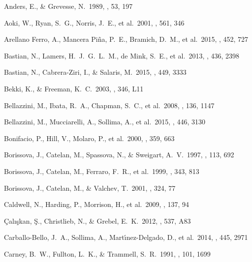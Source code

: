 \documentclass[12pt,preprint]{emulateapj}
\begin{document}
\begin{thebibliography}{}

 Anders, E., \& Grevesse, N.\ 1989, \gca, 53, 197

 Aoki, W., Ryan, S.~G., Norris, J.~E., et al.\ 2001, \apj, 561, 346

 Arellano Ferro, A., Mancera Pi{\~n}a, P.~E., Bramich, D.~M., et al.\ 2015, \mnras, 452, 727

 Bastian, N., Lamers, H.~J.~G.~L.~M., de Mink, S.~E., et al.\ 2013, \mnras, 436, 2398

 Bastian, N., Cabrera-Ziri, I., \& Salaris, M.\ 2015, \mnras, 449, 3333

 Bekki, K., \& Freeman, K.~C.\ 2003, \mnras, 346, L11

 Bellazzini, M., Ibata, R.~A., Chapman, S.~C., et al.\ 2008, \aj, 136, 1147

 Bellazzini, M., Mucciarelli, A., Sollima, A., et al.\ 2015, \mnras, 446, 3130

 Bonifacio, P., Hill, V., Molaro, P., et al.\ 2000, \aap, 359, 663

 Borissova, J., Catelan, M., Spassova, N., \& Sweigart, A.~V.\ 1997, \aj, 113, 692

 Borissova, J., Catelan, M., Ferraro, F.~R., et al.\ 1999, \aap, 343, 813

 Borissova, J., Catelan, M., \& Valchev, T.\ 2001, \mnras, 324, 77

 Caldwell, N., Harding, P., Morrison, H., et al.\ 2009, \aj, 137, 94

 {\c C}al{\i}{\c s}kan, {\c S}., Christlieb, N., \& Grebel, E.~K.\ 2012, \aap, 537, A83

 Carballo-Bello, J.~A., Sollima, A., Mart{\'{\i}}nez-Delgado, D., et al.\ 2014, \mnras, 445, 2971

 Carney, B.~W., Fullton, L.~K., \& Trammell, S.~R.\ 1991, \aj, 101, 1699


\end{thebibliography}
\end{document}
